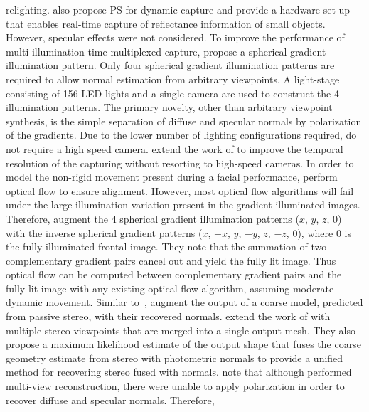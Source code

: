 relighting. 
\citet{malzbender2006surface} also propose PS for dynamic
capture and provide a hardware set up that enables real-time capture
of reflectance information of small objects. However, specular effects
were not considered.
To improve the performance of multi-illumination time multiplexed
capture, \citet{ma2007rapid} propose a spherical gradient illumination pattern.
Only four spherical gradient illumination patterns are required to allow
normal estimation from arbitrary viewpoints. A light-stage consisting of 156
LED lights and a single camera are used to construct the 4 illumination
patterns. The primary novelty, other than arbitrary viewpoint synthesis, is
the simple separation of diffuse and specular normals by polarization of the
gradients. Due to the lower number of lighting configurations required,
\citet{ma2007rapid} do not require a high speed camera.
\citet{wilson2010temporal} extend the work of \citet{ma2007rapid} to
improve the temporal resolution of the capturing without resorting to
high-speed cameras. In order to model the non-rigid movement present
during a facial performance, \citet{wilson2010temporal} perform optical
flow to ensure alignment. However, most optical flow algorithms will fail under
the large illumination variation present in the gradient illuminated images.
Therefore, \citet{wilson2010temporal} augment the 4 spherical gradient
illumination patterns ($x$, $y$, $z$, $0$) with the inverse spherical
gradient patterns ($x$, $-x$, $y$, $-y$, $z$, $-z$, $0$), where $0$ is the
fully illuminated frontal image. They note that the summation of two
complementary gradient pairs cancel out and yield the fully lit image. Thus
optical flow can be computed between complementary gradient pairs and the fully
lit image with any existing optical flow algorithm, assuming moderate dynamic
movement. Similar to~\cite{ma2007rapid,debevec2000acquiring,weyrich2006analysis},
\citet{wilson2010temporal} augment the output of a coarse model, predicted
from passive stereo, with their recovered normals.
\citet{fyffe2011comprehensive} extend the work of \citet{wilson2010temporal}
with multiple stereo viewpoints that are merged into a single output mesh.
They also propose a maximum likelihood estimate of the output shape
that fuses the coarse geometry estimate from stereo with photometric normals
to provide a unified method for recovering stereo fused with normals.
\citet{ghosh2011multiview} note that although \citet{fyffe2011comprehensive}
performed multi-view reconstruction, there were unable to apply polarization
in order to recover diffuse and specular normals. Therefore,
